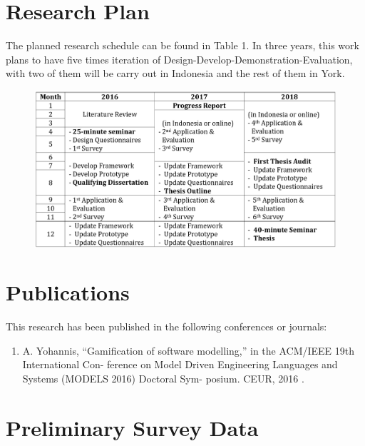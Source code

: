 \documentclass[12pt, a4paper]{report}
\begin{document}
\begin{appendices}

\chapter{Research Plan}
The planned research schedule can be found in Table 1. In three years, this work plans to have five times iteration of Design-Develop-Demonstration-Evaluation, with two of them will be carry out in Indonesia and the rest of them in York.

\begin {table}[ht]
\caption {Research Timetable} 
\end{table}
\begin{figure}[ht]
\centering
\includegraphics[width=\textwidth]{timetable}
\end{figure}

\chapter{Publications}
This research has been published in the following conferences or journals: 
\begin{enumerate}
 \item A. Yohannis, “Gamiﬁcation of software modelling,” in the ACM/IEEE 19th International Con-
ference on Model Driven Engineering Languages and Systems (MODELS 2016) Doctoral Sym-
posium. CEUR, 2016 \cite{Yohannis2016}.
\end{enumerate}

\chapter{Preliminary Survey Data}
\label{chap:Preliminary Survey Data}


\end{appendices}
\end{document}
